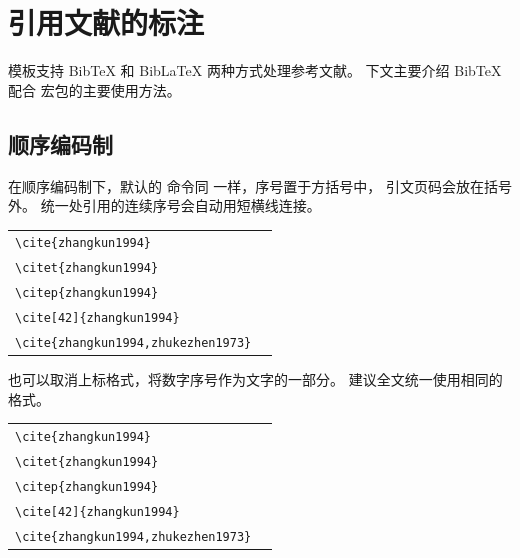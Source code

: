 
\chapter{引用文献的标注}

模板支持 BibTeX 和 BibLaTeX 两种方式处理参考文献。
下文主要介绍 BibTeX 配合  宏包的主要使用方法。


\section{顺序编码制}

在顺序编码制下，默认的  命令同  一样，序号置于方括号中，
引文页码会放在括号外。
统一处引用的连续序号会自动用短横线连接。

\noindent
\begin{tabular}{l@{\quad$\Rightarrow$\quad}l}
  \verb|\cite{zhangkun1994}|               & \cite{zhangkun1994}               \\
  \verb|\citet{zhangkun1994}|              & \citet{zhangkun1994}              \\
  \verb|\citep{zhangkun1994}|              & \citep{zhangkun1994}              \\
  \verb|\cite[42]{zhangkun1994}|           & \cite[42]{zhangkun1994}           \\
  \verb|\cite{zhangkun1994,zhukezhen1973}| & \cite{zhangkun1994,zhukezhen1973} \\
\end{tabular}


也可以取消上标格式，将数字序号作为文字的一部分。
建议全文统一使用相同的格式。

\noindent
\begin{tabular}{l@{\quad$\Rightarrow$\quad}l}
  \verb|\cite{zhangkun1994}|               & \cite{zhangkun1994}               \\
  \verb|\citet{zhangkun1994}|              & \citet{zhangkun1994}              \\
  \verb|\citep{zhangkun1994}|              & \citep{zhangkun1994}              \\
  \verb|\cite[42]{zhangkun1994}|           & \cite[42]{zhangkun1994}           \\
  \verb|\cite{zhangkun1994,zhukezhen1973}| & \cite{zhangkun1994,zhukezhen1973} \\
\end{tabular}



